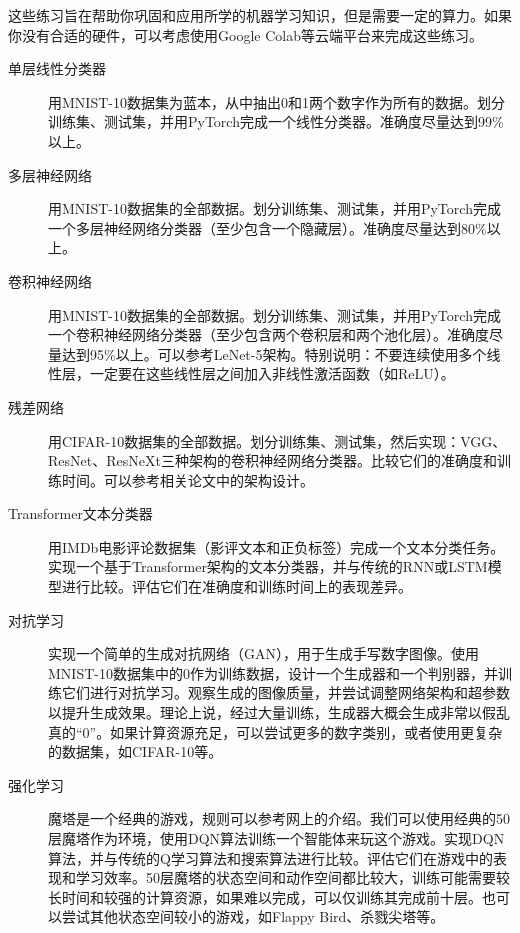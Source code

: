 \begin{exercise}[机器学习实操]
    这些练习旨在帮助你巩固和应用所学的机器学习知识，但是需要一定的算力。如果你没有合适的硬件，可以考虑使用Google Colab等云端平台来完成这些练习。
\begin{description}
    \item[单层线性分类器] 用MNIST-10数据集为蓝本，从中抽出0和1两个数字作为所有的数据。划分训练集、测试集，并用PyTorch完成一个线性分类器。准确度尽量达到99\%以上。
    \item[多层神经网络] 用MNIST-10数据集的全部数据。划分训练集、测试集，并用PyTorch完成一个多层神经网络分类器（至少包含一个隐藏层）。准确度尽量达到80\%以上。
    \item[卷积神经网络] 用MNIST-10数据集的全部数据。划分训练集、测试集，并用PyTorch完成一个卷积神经网络分类器（至少包含两个卷积层和两个池化层）。准确度尽量达到95\%以上。可以参考LeNet-5架构。特别说明：不要连续使用多个线性层，一定要在这些线性层之间加入非线性激活函数（如ReLU）。
    \item[残差网络] 用CIFAR-10数据集的全部数据。划分训练集、测试集，然后实现：VGG、ResNet、ResNeXt三种架构的卷积神经网络分类器。比较它们的准确度和训练时间。可以参考相关论文中的架构设计。
    \item[Transformer文本分类器] 用IMDb电影评论数据集（影评文本和正负标签）完成一个文本分类任务。实现一个基于Transformer架构的文本分类器，并与传统的RNN或LSTM模型进行比较。评估它们在准确度和训练时间上的表现差异。
    \item[对抗学习] 实现一个简单的生成对抗网络（GAN），用于生成手写数字图像。使用MNIST-10数据集中的0作为训练数据，设计一个生成器和一个判别器，并训练它们进行对抗学习。观察生成的图像质量，并尝试调整网络架构和超参数以提升生成效果。理论上说，经过大量训练，生成器大概会生成非常以假乱真的“0”。如果计算资源充足，可以尝试更多的数字类别，或者使用更复杂的数据集，如CIFAR-10等。
    \item[强化学习] 魔塔是一个经典的游戏，规则可以参考网上的介绍。我们可以使用经典的50层魔塔作为环境，使用DQN算法训练一个智能体来玩这个游戏。实现DQN算法，并与传统的Q学习算法和搜索算法进行比较。评估它们在游戏中的表现和学习效率。50层魔塔的状态空间和动作空间都比较大，训练可能需要较长时间和较强的计算资源，如果难以完成，可以仅训练其完成前十层。也可以尝试其他状态空间较小的游戏，如Flappy Bird、杀戮尖塔等。
\end{description}
\end{exercise}

